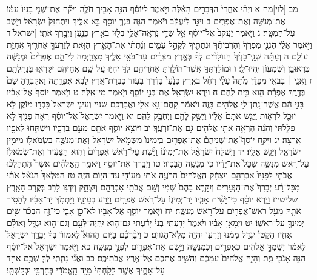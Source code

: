 \documentclass[twoside, openany, parskip=half, 11pt]{book}
\begin{document}
מב [לוי]מח א וַיְהִ֗י אַחֲרֵי֙ הַדְּבָרִ֣ים הָאֵ֔לֶּה וַיֹּ֣אמֶר לְיוֹסֵ֔ף הִנֵּ֥ה אָבִ֖יךָ חֹלֶ֑ה וַיִּקַּ֞ח אֶת־שְׁנֵ֤י בָנָיו֙ עִמּ֔וֹ אֶת־מְנַשֶּׁ֖ה וְאֶת־אֶפְרָֽיִם׃ ב וַיַּגֵּ֣ד לְיַעֲקֹ֔ב וַיֹּ֕אמֶר הִנֵּ֛ה בִּנְךָ֥ יוֹסֵ֖ף בָּ֣א אֵלֶ֑יךָ וַיִּתְחַזֵּק֙ יִשְׂרָאֵ֔ל וַיֵּ֖שֶׁב עַל־הַמִּטָּֽה׃ ג וַיֹּ֤אמֶר יַעֲקֹב֙ אֶל־יוֹסֵ֔ף אֵ֥ל שַׁדַּ֛י נִרְאָֽה־אֵלַ֥י בְּל֖וּז בְּאֶ֣רֶץ כְּנָ֑עַן וַיְבָ֖רֶךְ אֹתִֽי׃ [ישראל]ד וַיֹּ֣אמֶר אֵלַ֗י הִנְנִ֤י מַפְרְךָ֙ וְהִרְבִּיתִ֔ךָ וּנְתַתִּ֖יךָ לִקְהַ֣ל עַמִּ֑ים וְנָ֨תַתִּ֜י אֶת־הָאָ֧רֶץ הַזֹּ֛את לְזַרְעֲךָ֥ אַחֲרֶ֖יךָ אֲחֻזַּ֥ת עוֹלָֽם׃ ה וְעַתָּ֡ה שְׁנֵֽי־בָנֶ֩יךָ֩ הַנּוֹלָדִ֨ים לְךָ֜ בְּאֶ֣רֶץ מִצְרַ֗יִם עַד־בֹּאִ֥י אֵלֶ֛יךָ מִצְרַ֖יְמָה לִי־הֵ֑ם אֶפְרַ֙יִם֙ וּמְנַשֶּׁ֔ה כִּרְאוּבֵ֥ן וְשִׁמְע֖וֹן יִֽהְיוּ־לִֽי׃ ו וּמוֹלַדְתְּךָ֛ אֲשֶׁר־הוֹלַ֥דְתָּ אַחֲרֵיהֶ֖ם לְךָ֣ יִהְי֑וּ עַ֣ל שֵׁ֧ם אֲחֵיהֶ֛ם יִקָּרְא֖וּ בְּנַחֲלָתָֽם׃ ז וַאֲנִ֣י ׀ בְּבֹאִ֣י מִפַּדָּ֗ן מֵ֩תָה֩ עָלַ֨י רָחֵ֜ל בְּאֶ֤רֶץ כְּנַ֙עַן֙ בַּדֶּ֔רֶךְ בְּע֥וֹד כִּבְרַת־אֶ֖רֶץ לָבֹ֣א אֶפְרָ֑תָה וָאֶקְבְּרֶ֤הָ שָּׁם֙ בְּדֶ֣רֶךְ אֶפְרָ֔ת הִ֖וא בֵּ֥ית לָֽחֶם׃ ח וַיַּ֥רְא יִשְׂרָאֵ֖ל אֶת־בְּנֵ֣י יוֹסֵ֑ף וַיֹּ֖אמֶר מִי־אֵֽלֶּה׃ ט וַיֹּ֤אמֶר יוֹסֵף֙ אֶל־אָבִ֔יו בָּנַ֣י הֵ֔ם אֲשֶׁר־נָֽתַן־לִ֥י אֱלֹהִ֖ים בָּזֶ֑ה וַיֹּאמַ֕ר קָֽחֶם־נָ֥א אֵלַ֖י וַאֲבָרְכֵֽם׃ שניי וְעֵינֵ֤י יִשְׂרָאֵל֙ כָּבְד֣וּ מִזֹּ֔קֶן לֹ֥א יוּכַ֖ל לִרְא֑וֹת וַיַּגֵּ֤שׁ אֹתָם֙ אֵלָ֔יו וַיִּשַּׁ֥ק לָהֶ֖ם וַיְחַבֵּ֥ק לָהֶֽם׃ יא וַיֹּ֤אמֶר יִשְׂרָאֵל֙ אֶל־יוֹסֵ֔ף רְאֹ֥ה פָנֶ֖יךָ לֹ֣א פִלָּ֑לְתִּי וְהִנֵּ֨ה הֶרְאָ֥ה אֹתִ֛י אֱלֹהִ֖ים גַּ֥ם אֶת־זַרְעֶֽךָ׃ יב וַיּוֹצֵ֥א יוֹסֵ֛ף אֹתָ֖ם מֵעִ֣ם בִּרְכָּ֑יו וַיִּשְׁתַּ֥חוּ לְאַפָּ֖יו אָֽרְצָה׃ יג וַיִּקַּ֣ח יוֹסֵף֮ אֶת־שְׁנֵיהֶם֒ אֶת־אֶפְרַ֤יִם בִּֽימִינוֹ֙ מִשְּׂמֹ֣אל יִשְׂרָאֵ֔ל וְאֶת־מְנַשֶּׁ֥ה בִשְׂמֹאל֖וֹ מִימִ֣ין יִשְׂרָאֵ֑ל וַיַּגֵּ֖שׁ אֵלָֽיו׃ יד וַיִּשְׁלַח֩ יִשְׂרָאֵ֨ל אֶת־יְמִינ֜וֹ וַיָּ֨שֶׁת עַל־רֹ֤אשׁ אֶפְרַ֙יִם֙ וְה֣וּא הַצָּעִ֔יר וְאֶת־שְׂמֹאל֖וֹ עַל־רֹ֣אשׁ מְנַשֶּׁ֑ה שִׂכֵּל֙ אֶת־יָדָ֔יו כִּ֥י מְנַשֶּׁ֖ה הַבְּכֽוֹר׃ טו וַיְבָ֥רֶךְ אֶת־יוֹסֵ֖ף וַיֹּאמַ֑ר הָֽאֱלֹהִ֡ים אֲשֶׁר֩ הִתְהַלְּכ֨וּ אֲבֹתַ֤י לְפָנָיו֙ אַבְרָהָ֣ם וְיִצְחָ֔ק הָֽאֱלֹהִים֙ הָרֹעֶ֣ה אֹתִ֔י מֵעוֹדִ֖י עַד־הַיּ֥וֹם הַזֶּֽה׃ טז הַמַּלְאָךְ֩ הַגֹּאֵ֨ל אֹתִ֜י מִכׇּל־רָ֗ע יְבָרֵךְ֮ אֶת־הַנְּעָרִים֒ וְיִקָּרֵ֤א בָהֶם֙ שְׁמִ֔י וְשֵׁ֥ם אֲבֹתַ֖י אַבְרָהָ֣ם וְיִצְחָ֑ק וְיִדְגּ֥וּ לָרֹ֖ב בְּקֶ֥רֶב הָאָֽרֶץ׃ שלישייז וַיַּ֣רְא יוֹסֵ֗ף כִּי־יָשִׁ֨ית אָבִ֧יו יַד־יְמִינ֛וֹ עַל־רֹ֥אשׁ אֶפְרַ֖יִם וַיֵּ֣רַע בְּעֵינָ֑יו וַיִּתְמֹ֣ךְ יַד־אָבִ֗יו לְהָסִ֥יר אֹתָ֛הּ מֵעַ֥ל רֹאשׁ־אֶפְרַ֖יִם עַל־רֹ֥אשׁ מְנַשֶּֽׁה׃ יח וַיֹּ֧אמֶר יוֹסֵ֛ף אֶל־אָבִ֖יו לֹא־כֵ֣ן אָבִ֑י כִּי־זֶ֣ה הַבְּכֹ֔ר שִׂ֥ים יְמִינְךָ֖ עַל־רֹאשֽׁוֹ׃ יט וַיְמָאֵ֣ן אָבִ֗יו וַיֹּ֙אמֶר֙ יָדַ֤עְתִּֽי בְנִי֙ יָדַ֔עְתִּי גַּם־ה֥וּא יִֽהְיֶה־לְּעָ֖ם וְגַם־ה֣וּא יִגְדָּ֑ל וְאוּלָ֗ם אָחִ֤יו הַקָּטֹן֙ יִגְדַּ֣ל מִמֶּ֔נּוּ וְזַרְע֖וֹ יִהְיֶ֥ה מְלֹֽא־הַגּוֹיִֽם׃ כ וַיְבָ֨רְכֵ֜ם בַּיּ֣וֹם הַהוּא֮ לֵאמוֹר֒ בְּךָ֗ יְבָרֵ֤ךְ יִשְׂרָאֵל֙ לֵאמֹ֔ר יְשִֽׂמְךָ֣ אֱלֹהִ֔ים כְּאֶפְרַ֖יִם וְכִמְנַשֶּׁ֑ה וַיָּ֥שֶׂם אֶת־אֶפְרַ֖יִם לִפְנֵ֥י מְנַשֶּֽׁה׃ כא וַיֹּ֤אמֶר יִשְׂרָאֵל֙ אֶל־יוֹסֵ֔ף הִנֵּ֥ה אָנֹכִ֖י מֵ֑ת וְהָיָ֤ה אֱלֹהִים֙ עִמָּכֶ֔ם וְהֵשִׁ֣יב אֶתְכֶ֔ם אֶל־אֶ֖רֶץ אֲבֹתֵיכֶֽם׃ כב וַאֲנִ֞י נָתַ֧תִּֽי לְךָ֛ שְׁכֶ֥ם אַחַ֖ד עַל־אַחֶ֑יךָ אֲשֶׁ֤ר לָקַ֙חְתִּי֙ מִיַּ֣ד הָֽאֱמֹרִ֔י בְּחַרְבִּ֖י וּבְקַשְׁתִּֽי׃
\end{document}
